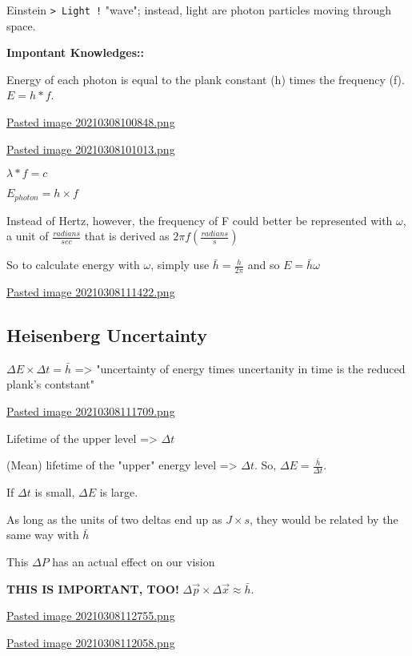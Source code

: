 \documentclass[letterpaper]{article}
\begin{document}
Einstein \texttt{> Light !} "wave"; instead, light are photon particles moving
through space.

\textbf{Impontant Knowledges::}

Energy of each photon is equal to the plank constant (h) times the
frequency (f). \(E = h*f\).

\href{Pasted image 20210308100848.png.org}{Pasted image
20210308100848.png}

\href{Pasted image 20210308101013.png.org}{Pasted image
20210308101013.png}

\(\lambda * f = c\)

\(E_{photon} = h \times f\)

Instead of Hertz, however, the frequency of F could better be
represented with \(\omega\), a unit of \(\frac{radians}{sec}\) that is
derived as \(2 \pi f (\frac{radians}{s})\)

So to calculate energy with \(\omega\), simply use
\(\bar{h} = \frac{h}{2\pi}\) and so \(E = \bar{h}\omega\)

\href{Pasted image 20210308111422.png.org}{Pasted image
20210308111422.png}

\subsection{Heisenberg Uncertainty}
\label{sec:orgfc6352b}
\(\Delta E \times \Delta t = \bar{h}\) => "uncertainty of energy times
uncertanity in time is the reduced plank's contstant"

\href{Pasted image 20210308111709.png.org}{Pasted image
20210308111709.png}

Lifetime of the upper level => \(\Delta t\)

(Mean) lifetime of the "upper" energy level => \(\Delta t\). So,
\(\Delta E = \frac{\bar{h}}{\Delta t}\).

If \(\Delta t\) is small, \(\Delta E\) is large.

As long as the units of two deltas end up as \(J \times s\), they would
be related by the same way with \(\bar{h}\)

This \(\Delta P\) has an actual effect on our vision

\textbf{THIS IS IMPORTANT, TOO!}
\(\Delta \vec{p} \times \Delta \vec{x} \approx \bar{h}\).

\href{Pasted image 20210308112755.png.org}{Pasted image
20210308112755.png}

\href{Pasted image 20210308112058.png.org}{Pasted image
20210308112058.png}
\end{document}
